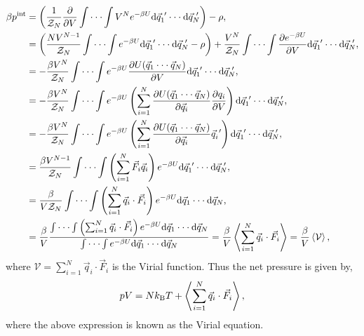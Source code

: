 \documentclass[a4paper]{article}
\begin{document}
\begin{equation}
\begin{split}
\beta p^{\rm int}&=\left(\frac{1}{\mathcal{Z}_{N}}\frac{\partial}{\partial V}\int\cdot\cdot\cdot\int V^{N}e^{-\beta U}{\rm d}\vec{q}_{1}^{~\prime}\cdot\cdot\cdot{\rm d}\vec{q}_{N}^{~\prime}\right)-\rho,\\
&=\left(\frac{NV^{N-1}}{\mathcal{Z}_{N}}\int\cdot\cdot\cdot\int e^{-\beta U}{\rm d}\vec{q}_{1}^{~\prime}\cdot\cdot\cdot{\rm d}\vec{q}_{N}^{~\prime}-\rho\right)+\frac{V^{N}}{\mathcal{Z}_{N}}\int\cdot\cdot\cdot\int \frac{\partial e^{-\beta U}}{\partial V}{\rm d}\vec{q}_{1}^{~\prime}\cdot\cdot\cdot{\rm d}\vec{q}_{N}^{~\prime},\\
&=-\frac{\beta V^{N}}{\mathcal{Z}_{N}}\int\cdot\cdot\cdot\int e^{-\beta U}\frac{\partial U(\vec{q}_{1}\cdot\cdot\cdot\vec{q}_{N})}{\partial V}{\rm d}\vec{q}_{1}^{~\prime}\cdot\cdot\cdot{\rm d}\vec{q}_{N}^{~\prime},\\
&=-\frac{\beta V^{N}}{\mathcal{Z}_{N}}\int\cdot\cdot\cdot\int e^{-\beta U}\left(\sum_{i=1}^{N}\frac{\partial U(\vec{q}_{1}\cdot\cdot\cdot\vec{q}_{N})}{\partial \vec{q}_{i}}\frac{\partial q_{i}}{\partial V}\right){\rm d}\vec{q}_{1}^{~\prime}\cdot\cdot\cdot{\rm d}\vec{q}_{N}^{~\prime},\\
&=-\frac{\beta V^{N}}{\mathcal{Z}_{N}}\int\cdot\cdot\cdot\int e^{-\beta U}\left(\sum_{i=1}^{N}\frac{\partial U(\vec{q}_{1}\cdot\cdot\cdot\vec{q}_{N})}{\partial \vec{q}_{i}} \vec{q}_{i}^{~\prime}\right){\rm d}\vec{q}_{1}^{~\prime}\cdot\cdot\cdot{\rm d}\vec{q}_{N}^{~\prime},\\
&=\frac{\beta V^{N-1}}{\mathcal{Z}_{N}}\int\cdot\cdot\cdot\int \left(\sum_{i=1}^{N} \Vec{F}_{i}\vec{q}_{i}\right)e^{-\beta U}{\rm d}\vec{q}_{1}^{~\prime}\cdot\cdot\cdot{\rm d}\vec{q}_{N}^{~\prime},\\
&=\frac{\beta}{V\mathcal{Z}_{N}}\int\cdot\cdot\cdot\int \left(\sum_{i=1}^{N} \vec{q}_{i}\cdot\Vec{F}_{i}\right)e^{-\beta U}{\rm d}\vec{q}_{1}\cdot\cdot\cdot{\rm d}\vec{q}_{N},\\
&=\frac{\beta}{V}\frac{\int\cdot\cdot\cdot\int \left(\sum_{i=1}^{N} \vec{q}_{i}\cdot\Vec{F}_{i}\right)e^{-\beta U}{\rm d}\vec{q}_{1}\cdot\cdot\cdot{\rm d}\vec{q}_{N}}{\int\cdot\cdot\cdot\int e^{-\beta U}{\rm d}\vec{q}_{1}\cdot\cdot\cdot{\rm d}\vec{q}_{N}}=\frac{\beta}{V}\left<\sum_{i=1}^{N} \vec{q}_{i}\cdot\Vec{F}_{i}\right>=\frac{\beta}{V}\left<\mathcal{V}\right>,\\
\end{split}
\end{equation}
where $\mathcal{V}=\sum_{i=1}^{N} \vec{q}_{i}\cdot\Vec{F}_{i}$ is the Virial function. Thus the net pressure is given by,
\begin{equation}
pV=Nk_{\rm B}T+\left<\sum_{i=1}^{N} \vec{q}_{i}\cdot\Vec{F}_{i}\right>,
\end{equation}
where the above expression is known as the Virial equation.
\end{document}
